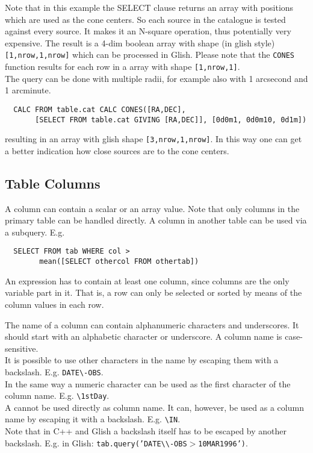 Note that in this example the SELECT clause returns an array with positions
which are used as the cone centers. So each source in the catalogue is
tested against every source. It makes it an N-square operation, thus
potentially very expensive.
The result is a 4-dim boolean array with shape (in glish style)
\texttt{[1,nrow,1,nrow]} which can be processed in Glish. Please note
that the \texttt{CONES} function results for 
each row in a array with shape \texttt{[1,nrow,1]}.
\\The query can be done with multiple radii, for example also
with 1 arcsecond and 1 arcminute.
\begin{verbatim}
  CALC FROM table.cat CALC CONES([RA,DEC],
       [SELECT FROM table.cat GIVING [RA,DEC]], [0d0m1, 0d0m10, 0d1m])
\end{verbatim}
resulting in an array with glish shape \texttt{[3,nrow,1,nrow]}.
In this way one can get a better indication how close sources are to
the cone centers.


\subsection{\label{TAQL:COLUMNS}Table Columns}
A column can contain a scalar or an array value.
Note that only columns in the primary table can be handled directly.
A column in another table can be used via a subquery. E.g.
\begin{verbatim}
  SELECT FROM tab WHERE col >
        mean([SELECT othercol FROM othertab])
\end{verbatim}
An expression has to contain at least one column, since columns
are the only variable part in it. That is, a row can only be selected
or sorted by means of the column values in each row.

The name of a column can contain alphanumeric characters and underscores.
It should start with an alphabetic character or underscore.
A column name is case-sensitive.
\\It is possible to use other characters in the name by
escaping them with a backslash. E.g. \texttt{DATE}\verb+\+\texttt{-OBS}.
\\In the same way a numeric character can be used as the first
character of the column name. E.g. \verb+\+\texttt{1stDay}.
\\
A  cannot
be used directly as column name.
It can, however, be used as a column name by escaping
it with a backslash. E.g. \verb+\+\texttt{IN}.
\\Note that in C++ and Glish a backslash itself has to be escaped
by another backslash. E.g. in Glish:
\texttt{tab.query('DATE}\verb+\\+\texttt{-OBS$>$10MAR1996')}.

